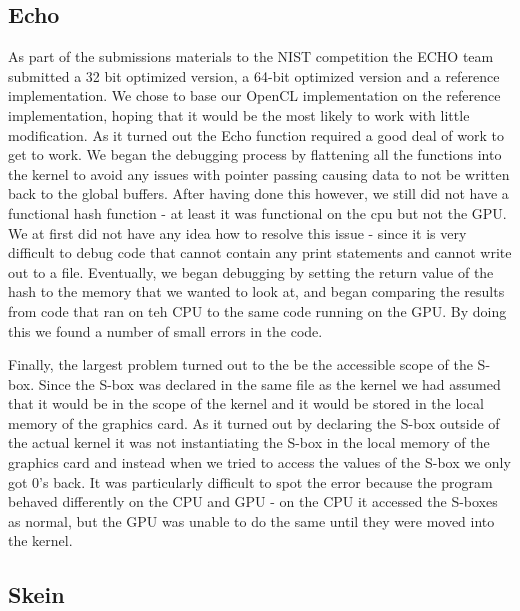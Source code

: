 \subsection*{Echo}

As part of the submissions materials to the NIST competition the ECHO team submitted a 32 bit optimized version, a 64-bit optimized version and a reference implementation.  
We chose to base our OpenCL implementation on the reference implementation, hoping that it would be the most likely to work with little modification.
As it turned out the Echo function required a good deal of work to get to work.
We began the debugging process by flattening all the functions into the kernel to avoid any issues with pointer passing causing data to not be written back to the global buffers.
After having done this however, we still did not have a functional hash function - at least it was functional on the cpu but not the GPU.  
We at first did not have any idea how to resolve this issue - since it is very difficult to debug code that cannot contain any print statements and cannot write out to a file. 
Eventually, we began debugging by setting the return value of the hash to the memory that we wanted to look at, and began comparing the results from code that ran on teh CPU to the same code running on the GPU.
By doing this we found a number of small errors in the code.

Finally, the largest problem turned out to the be the accessible scope of the S-box.
Since the S-box was declared in the same file as the kernel we had assumed that it would be in the scope of the kernel and it would be stored in the local memory of the graphics card.
As it turned out by declaring the S-box outside of the actual kernel it was not instantiating the S-box in the local memory of the graphics card and instead when we tried to access the values of the S-box we only got 0's back.
It was particularly difficult to spot the error because the program behaved differently on the CPU and GPU - on the CPU it accessed the S-boxes as normal, but the GPU was unable to do the same until they were moved into the kernel.

\subsection*{Skein}
